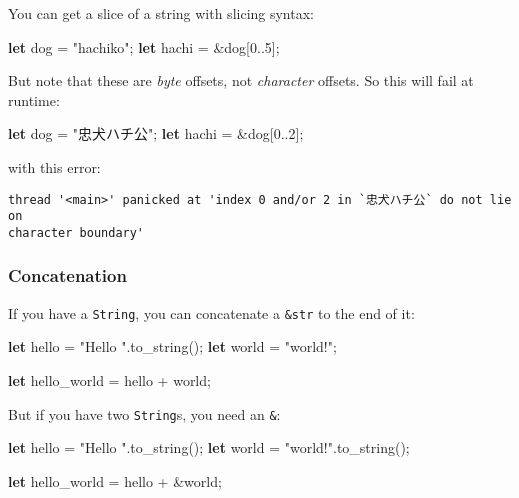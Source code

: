 \documentclass[a4paper,]{book}
\newenvironment{Shaded}{\begin{snugshade}}{\end{snugshade}}
\newcommand{\KeywordTok}[1]{\textcolor[rgb]{0.13,0.29,0.53}{\textbf{{#1}}}}
\newcommand{\DecValTok}[1]{\textcolor[rgb]{0.00,0.00,0.81}{{#1}}}
\newcommand{\StringTok}[1]{\textcolor[rgb]{0.31,0.60,0.02}{{#1}}}
\newcommand{\NormalTok}[1]{{#1}}
\begin{document}
You can get a slice of a string with slicing syntax:

\begin{Shaded}
\begin{Highlighting}[]
\KeywordTok{let} \NormalTok{dog = }\StringTok{"hachiko"}\NormalTok{;}
\KeywordTok{let} \NormalTok{hachi = &dog[}\DecValTok{0.}\NormalTok{.}\DecValTok{5}\NormalTok{];}
\end{Highlighting}
\end{Shaded}

But note that these are \emph{byte} offsets, not \emph{character}
offsets. So this will fail at runtime:

\begin{Shaded}
\begin{Highlighting}[]
\KeywordTok{let} \NormalTok{dog = }\StringTok{"忠犬ハチ公"}\NormalTok{;}
\KeywordTok{let} \NormalTok{hachi = &dog[}\DecValTok{0.}\NormalTok{.}\DecValTok{2}\NormalTok{];}
\end{Highlighting}
\end{Shaded}

with this error:

\begin{verbatim}
thread '<main>' panicked at 'index 0 and/or 2 in `忠犬ハチ公` do not lie on
character boundary'
\end{verbatim}

\subsubsection{Concatenation}\label{concatenation}

If you have a \texttt{String}, you can concatenate a \texttt{\&str} to
the end of it:

\begin{Shaded}
\begin{Highlighting}[]
\KeywordTok{let} \NormalTok{hello = }\StringTok{"Hello "}\NormalTok{.to_string();}
\KeywordTok{let} \NormalTok{world = }\StringTok{"world!"}\NormalTok{;}

\KeywordTok{let} \NormalTok{hello_world = hello + world;}
\end{Highlighting}
\end{Shaded}

But if you have two \texttt{String}s, you need an \texttt{\&}:

\begin{Shaded}
\begin{Highlighting}[]
\KeywordTok{let} \NormalTok{hello = }\StringTok{"Hello "}\NormalTok{.to_string();}
\KeywordTok{let} \NormalTok{world = }\StringTok{"world!"}\NormalTok{.to_string();}

\KeywordTok{let} \NormalTok{hello_world = hello + &world;}
\end{Highlighting}
\end{Shaded}
\end{document}
